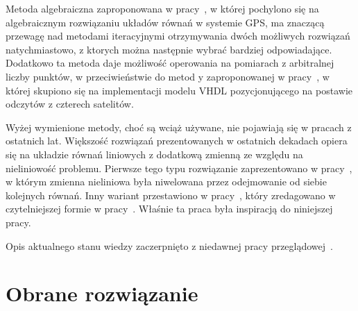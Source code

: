 Metoda algebraiczna zaproponowana w pracy~\cite{4104017}, w której pochylono się na algebraicznym rozwiązaniu układów równań w systemie GPS, ma znaczącą przewagę nad metodami iteracyjnymi otrzymywania dwóch możliwych rozwiązań natychmiastowo, z ktorych można następnie wybrać bardziej odpowiadające. Dodatkowo ta metoda daje możliwość operowania na pomiarach z arbitralnej liczby punktów, w przeciwieństwie do metod y zaproponowanej w pracy~\cite{article}, w której skupiono się na implementacji modelu VHDL pozycjonującego na postawie odczytów z czterech satelitów.

Wyżej wymienione metody, choć są wciąż używane, nie pojawiają się w pracach z ostatnich lat. Większość rozwiązań prezentowanych w ostatnich dekadach opiera się na układzie równań liniowych z dodatkową zmienną ze względu na nieliniowość problemu. Pierwsze tego typu rozwiązanie zaprezentowano w pracy~\cite{301830}, w którym zmienna nieliniowa była niwelowana przez odejmowanie od siebie kolejnych równań. Inny wariant przestawiono w pracy~\cite{1018778}, który zredagowano w czytelniejszej formie w pracy~\cite{norrdine2012algebraic}. Właśnie ta praca była inspiracją do niniejszej pracy.

Opis aktualnego stanu wiedzy zaczerpnięto z niedawnej pracy przeglądowej~\cite{10419087}.


\section{Obrane rozwiązanie}

